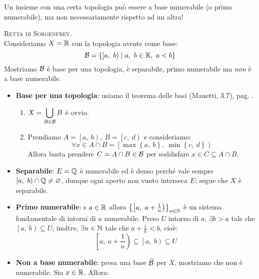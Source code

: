 \begin{attention}
Un insieme con una certa topologia può essere a base numerabile (o primo numerabile), ma non necessariamente rispetto ad un altra!
\end{attention}
\begin{example}
\textsc{Retta di Sorgenfrey}.\\
Consideriamo $X=\mathbb{R}$ con la topologia avente come base:
\begin{equation}
\basis=\left\{\left[a,\ b\right)\mid a,\ b\in\realset,\ a<b\right\}
\end{equation}
Mostriamo $\mathcal{B}$ è base per una topologia, è separabile, primo numerabile ma \textit{non} è a base numerabile.
\begin{itemize}
	\item \textbf{Base per una topologia}: usiamo il teorema delle basi (Manetti, 3.7), pag. \pageref{teoremabasi}.
	\begin{enumerate}[label=\Roman*]
		\item $\displaystyle X=\mathop{{\bigcup}}\displaylimits_{B\in \mathcal{B}}B$ è ovvio.
		\item Prendiamo $A=\left[a,\ b\right),\ B=\left[c,\ d\right)$ e consideriamo:
		\begin{equation*}
			\forall x\in A\cap B=\left[\max\left\{a,\ b\right\},\ \min\left\{c,\ d\right\}\right)
		\end{equation*}
	Allora basta prendere $C=A\cap B\in\mathcal{B}$ per soddisfare $x\in C\subseteq A\cap B$.
	\end{enumerate}
\item \textbf{Separabile}: $E=\mathbb{Q}$ è numerabile ed è denso perché vale sempre $\left[a,\ b\right)\cap \mathbb{Q} \neq \varnothing$, dunque ogni aperto non vuoto interseca $E$; segue che $X$ è separabile.
\item \textbf{Primo numerabile}: s $a\in\mathbb{R}$ allora $\left\{\left[a,\ a+\frac{1}{n}\right)\right\}_{n\in\naturalset}$ è un sistema fondamentale di intorni di $a$ numerabile. Preso $U$ intorno di $a$, $\exists b>a$ tale che $\left[a,\ b\right)\subseteq U$; inoltre, $\exists n\in\mathbb{N}$ tale che $a+\frac{1}{n}<b$, cioè:
\begin{equation*}
\left[a,\ a+\frac{1}{n}\right)\subseteq\left[a,\ b\right)\subseteq U
\end{equation*}
\item \textbf{Non a base numerabile}: presa una base $\widetilde{\mathcal{B}}$ per $X$, mostriamo che non è numerabile. Sia $x\in\mathbb{R}$. Allora:
\begin{equation*}

\end{equation*}
\end{itemize}
\end{example}
